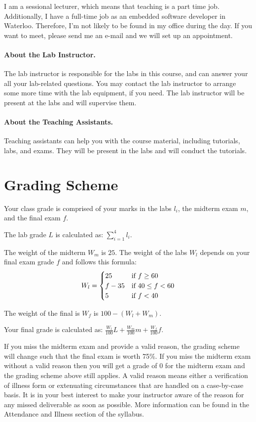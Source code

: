 \documentclass[letterpaper,10pt]{article}
\begin{document}
I am a sessional lecturer, which means that teaching is a part time job. Additionally, I have a full-time job as an embedded software developer in Waterloo. Therefore, I'm not likely to be found in my office during the day. If you want to meet, please send me an e-mail and we will set up an appointment.

\paragraph{About the Lab Instructor.}

The lab instructor is responsible for the labs in this course, and can answer your all your lab-related questions. You may contact the lab instructor to arrange some more time with the lab equipment, if you need. The lab instructor will be present at the labs and will supervise them.

\paragraph{About the Teaching Assistants.}

Teaching assistants can help you with the course material, including tutorials, labs, and exams. They will be present in the labs and will conduct the tutorials.

\section*{Grading Scheme}

Your class grade is comprised of your marks in the labs $l_{i}$, the midterm exam $m$, and the final exam $f$.

The lab grade $L$ is calculated as: $\sum_{i=1}^{4}l_{i}$.

The weight of the midterm $W_{m}$ is $25$. The weight of the labs $W_{l}$ depends on your final exam grade $f$ and follows this formula:
\[
 W_{l} = \begin{cases}
        25      & $if~$ f \ge 60\\
        f - 35  & $if~$ 40 \le f < 60\\
        5       & $if~$ f < 40
        \end{cases}
\]

The weight of the final is $W_{f}$ is $100 - (W_{l} + W_{m})$.

Your final grade is calculated as: $\frac{W_{l}}{100}L + \frac{W_{m}}{100}m + \frac{W_{f}}{100}f $.

If you miss the midterm exam and provide a valid reason, the grading scheme will change such that the final exam is worth 75\%. If you miss the midterm exam without a valid reason then you will get a grade of 0 for the midterm exam and the grading scheme above still applies. A valid reason means either a verification of illness form or extenuating circumstances that are handled on a case-by-case basis. It is in your best interest to make your instructor aware of the reason for any missed deliverable as soon as possible. More information can be found in the Attendance and Illness section of the syllabus.
\end{document}
